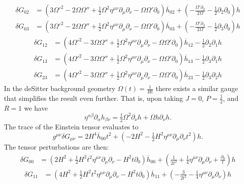 \documentclass[10pt,letterpaper]{article}
\newcommand{\be}{\begin{equation}} %
\newcommand{\ee}{\end{equation}} %
\newcommand{\pd}{\partial}
\numberwithin{equation}{section}
\begin{document}
\begin{align}
	\delta G_{02} &= (3 \Omega '^2 - 2 \Omega \Omega '' + \tfrac{1}{2} \Omega^2 \eta^{\mu \nu} \partial_{\mu} \partial_{\nu} -  \Omega \Omega ' \partial_{0}) \overline{h}_{02} + (- \frac{\Omega ' \partial_{2}}{2 \Omega} -  \tfrac{1}{2} \partial_{2} \partial_{0}) h
\end{align}
\begin{align}
	\delta G_{03} &= (3 \Omega '^2 - 2 \Omega \Omega '' + \tfrac{1}{2} \Omega^2 \eta^{\mu \nu} \partial_{\mu} \partial_{\nu} -  \Omega \Omega ' \partial_{0}) \overline{h}_{03} + (- \frac{\Omega ' \partial_{3}}{2 \Omega} -  \tfrac{1}{2} \partial_{3} \partial_{0}) h
\end{align}
\begin{align}
	\delta G_{12} &=(4 \Omega '^2 - 3 \Omega \Omega '' + \tfrac{1}{2} \Omega^2 \eta^{\mu \nu} \partial_{\mu} \partial_{\nu} -  \Omega \Omega ' \partial_{0}) \overline{h}_{12} -  \tfrac{1}{2} \partial_{2} \partial_{1} h
\end{align}
\begin{align}
	\delta G_{13} &=(4 \Omega '^2 - 3 \Omega \Omega '' + \tfrac{1}{2} \Omega^2 \eta^{\mu \nu} \partial_{\mu} \partial_{\nu} -  \Omega \Omega ' \partial_{0}) \overline{h}_{13} -  \tfrac{1}{2} \partial_{3} \partial_{1} h
\end{align}
\begin{align}
	\delta G_{23} &= (4 \Omega '^2 - 3 \Omega \Omega '' + \tfrac{1}{2} \Omega^2 \eta^{\mu \nu} \partial_{\mu} \partial_{\nu} -  \Omega \Omega ' \partial_{0}) \overline{h}_{23} -  \tfrac{1}{2} \partial_{3} \partial_{2} h
\end{align}
In the deSitter background geometry $\Omega(t) = \frac{1}{Ht}$ there exists a similar gauge that simplifies the result even further. That is, upon taking $J = 0$, $P = \tfrac12$, and $R = 1$ we have
\be
	\eta^{\alpha\beta}\pd_{\alpha}h_{\beta\nu} =  \tfrac12\Omega^2 \pd_\nu h + \Omega h \pd_\nu h.
\ee
The trace of the Einstein tensor evaluates to 
\be
	g^{\mu\nu}\delta G_{\mu\nu} =2 H^4 \overline{h}_{00} t^2 + (-2 H^2 -  \tfrac{1}{2} H^2 \eta^{\mu \nu} \partial_{\mu} \partial_{\nu} t^2) h.
\ee
The tensor perturbations are then:
\begin{align}
	\delta  G_{00} &=(2 H^2 + \tfrac{1}{2} H^2 t^2 \eta^{\mu \nu} \partial_{\mu} \partial_{\nu} -  H^2 t \partial_{0}) \overline{h}_{00} + (\frac{1}{2 t^2} + \tfrac{1}{4} \eta^{\mu \nu} \partial_{\mu} \partial_{\nu} + \frac{\partial_{0}}{t}) h
\end{align}
\begin{align}
	\delta  G_{11} &= (4 H^2 + \tfrac{1}{2} H^2 t^2 \eta^{\mu \nu} \partial_{\mu} \partial_{\nu} -  H^2 t \partial_{0}) \overline{h}_{11} + (- \frac{3}{2 t^2} -  \tfrac{1}{4} \eta^{\mu \nu} \partial_{\mu} \partial_{\nu}) h
\end{align}
\end{document}
